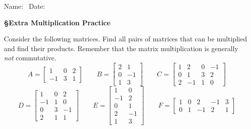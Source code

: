 \documentclass[11pt,answers]{exam} %
\begin{document}
\flushleft
Name:\ \makebox[4in]{\hrulefill} \hspace{1in} Date:\ \makebox[1in]{\hrulefill}
\begin{center}
    \textbf{\S Extra Multiplication Practice}
\end{center}

Consider the following matrices. Find all pairs of matrices that can be multiplied and find their products. Remember that the matrix multiplication is generally \emph{not} commutative.
\[
A =
\begin{bmatrix}
1 & 0 & 2 \\
-1 & 3 & 1
\end{bmatrix}
\qquad
B =
\begin{bmatrix}
2 & 1 \\
0 & -1 \\
1 & 3
\end{bmatrix}
\qquad
C =
\begin{bmatrix}
1 & 2 & 0 & -1 \\
0 & 1 & 3 & 2 \\
2 & -1 & 1 & 0
\end{bmatrix}
\]
\[
D =
\begin{bmatrix}
1 & 0 & 2 \\
-1 & 1 & 0 \\
0 & 3 & -1 \\
2 & 1 & 1
\end{bmatrix}
\qquad
E =
\begin{bmatrix}
1 & 0 \\
-1 & 2 \\
0 & 1 \\
2 & -1 \\
1 & 3
\end{bmatrix}
\qquad
F =
\begin{bmatrix}
1 & 0 & 2 & -1 & 3 \\
0 & 1 & -1 & 2 & 1
\end{bmatrix}
\]



\end{document}
